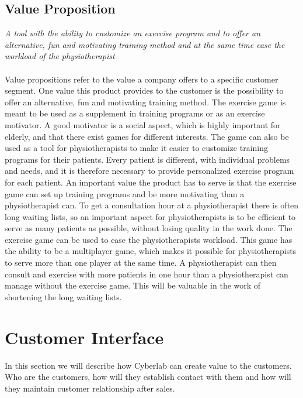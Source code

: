 \subsection{Value Proposition}
\emph{A tool with the ability to customize an exercise program and to offer an alternative, fun and motivating training method and at the same time ease the workload of the physiotherapist}\\ \\
Value propositions refer to the value a company offers to a specific customer segment. One value this product provides to the customer is the possibility to offer an alternative, fun and motivating training method. The exercise game is meant to be used as a supplement in training programs or as an exercise motivator. A good motivator is a social aspect, which is highly important for elderly, and that there exist games for different interests. The game can also be used as a tool for physiotherapists to make it easier to customize training programs for their patients. Every patient is different, with individual problems and needs, and it is therefore necessary to provide personalized exercise program for each patient. An important value the product has to serve is that the exercise game can set up training programs and be more motivating than a physiotherapist can. To get a consultation hour at a physiotherapist there is often long waiting lists, so an important aspect for physiotherapists is to be efficient to serve as many patients as possible, without losing quality in the work done. The exercise game can be used to ease the physiotherapists workload. This game has the ability to be a multiplayer game, which makes it possible for physiotherapists to serve more than one player at the same time. A physiotherapist can then consult and exercise with more patients in one hour than a physiotherapist can manage without the exercise game. This will be valuable in the work of shortening the long waiting lists.
\section{Customer Interface}
In this section we will describe how Cyberlab can create value to the customers. Who are the customers, how will they establish contact with them and how will they maintain customer relationship after sales.
